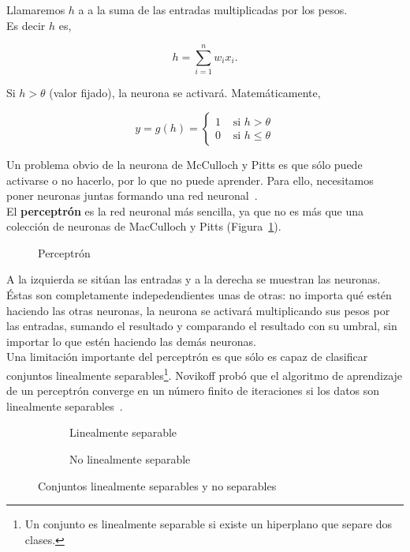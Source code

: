Llamaremos $h$ a a la suma de las entradas multiplicadas por los pesos.\\

Es decir $h$ es,

\begin{equation}
h = \sum_{i=1}^{n} w_i x_i.
\end{equation}

Si $h > \theta$ (valor fijado), la neurona se activará. Matemáticamente,

\begin{equation}
y = g(h) =
\begin{cases}
1 & \text{ si } h > \theta \\
0 & \text{ si } h  \leq \theta
\end{cases}
\end{equation}

Un problema obvio de la neurona de McCulloch y Pitts es que sólo puede activarse o no hacerlo, por lo que no puede aprender. Para ello, necesitamos poner neuronas juntas formando una red neuronal~\cite[pág 11]{Marsland:2009:MLA:1571643}.\\

El \textbf{perceptrón} es la red neuronal más sencilla, ya que no es más que una colección de neuronas de MacCulloch y Pitts (Figura~\ref{fig:perceptron}).

\begin{figure}[htbp!]
	\centering
	\perceptron
	\caption{Perceptrón}
	\label{fig:perceptron}
\end{figure}

A la izquierda se sitúan las entradas y a la derecha se muestran las neuronas. Éstas son completamente indepedendientes unas de otras: no importa qué estén haciendo las otras neuronas, la neurona se activará multiplicando sus pesos por las entradas, sumando el resultado y comparando el resultado con su umbral, sin importar lo que estén haciendo las demás neuronas.\\

Una limitación importante del perceptrón es que sólo es capaz de clasificar conjuntos linealmente separables\footnote{Un conjunto es linealmente separable si existe un hiperplano que separe dos clases.}. Novikoff probó que el algoritmo de aprendizaje de un perceptrón converge en un número finito de iteraciones si los datos son linealmente separables~\cite{Novikoff:1962}.\\

\begin{figure}[htbp!]
	\begin{center}
		\begin{subfigure}[b]{.40\textwidth}
			\centering
			\linealmenteseparable
			\caption{Linealmente separable}
		\end{subfigure}
		\begin{subfigure}[b]{.40\textwidth}
			\centering
			\nolinealmenteseparable
			\caption{No linealmente separable}
		\end{subfigure}
		
	\end{center}
	\caption{Conjuntos linealmente separables y no separables}
	\label{fig:linealmente_separable}
\end{figure}

